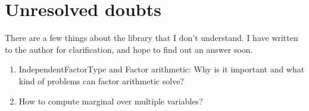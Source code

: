 \documentclass[12pt,oneside,letterpaper]{article}
\begin{document}
\section{Unresolved doubts}
There are a few things about the library that I don't understand. I have
written to the author for clarification, and hope to find out an answer soon.

\begin{enumerate}
  \item IndependentFactorType and Factor arithmetic: Why is it important and what kind of problems can factor arithmetic solve?
  \item How to compute marginal over multiple variables?
\end{enumerate}
\end{document}
